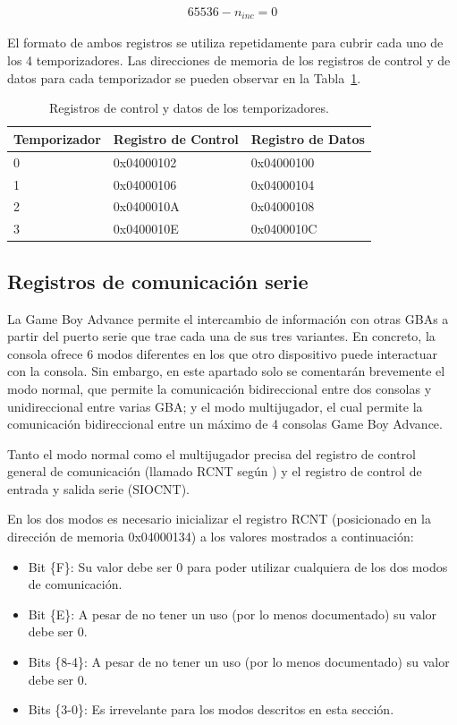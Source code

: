 \begin{align}
	65536 - n_{inc} = 0
	\label{eq:eq_temporizador}
\end{align}

El formato de ambos registros se utiliza repetidamente para cubrir cada uno de los 4 temporizadores. Las direcciones de memoria de los registros de control y de datos para cada temporizador se pueden observar en la Tabla~\ref{tab:temporizadores}.

\begin{table}[h]
	\centering
	\begin{tabular}{| l | l | l |}
		\hline
		\textbf{Temporizador} & \textbf{Registro de Control} & \textbf{Registro de Datos}  \\ \hline
		0 &  0x04000102 & 0x04000100  \\ \hline
		1 &  0x04000106 & 0x04000104  \\ \hline
		2 &  0x0400010A & 0x04000108  \\ \hline
		3 &  0x0400010E & 0x0400010C  \\ \hline
	\end{tabular}
	\caption{Registros de control y datos de los temporizadores.}\label{tab:temporizadores}
\end{table}
\FloatBarrier{}

\subsection{Registros de comunicación serie}
La Game Boy Advance permite el intercambio de información con otras GBAs a partir del puerto serie que trae cada una de sus tres variantes. En concreto, la consola ofrece 6 modos diferentes en los que otro dispositivo puede interactuar con la consola. Sin embargo, en este apartado solo se comentarán brevemente el modo normal, que permite la comunicación bidireccional entre dos consolas y unidireccional entre varias GBA; y el modo multijugador, el cual permite la comunicación bidireccional entre un máximo de 4 consolas Game Boy Advance.

Tanto el modo normal como el multijugador precisa del registro de control general de comunicación (llamado RCNT según \cite{bib:gbatek}) y el registro de control de entrada y salida serie (SIOCNT).

En los dos modos es necesario inicializar el registro RCNT (posicionado en la dirección de memoria 0x04000134) a los valores mostrados a continuación:

\begin{itemize}
	\item Bit \{F\}: Su valor debe ser 0 para poder utilizar cualquiera de los dos modos de comunicación.
	\item Bit \{E\}: A pesar de no tener un uso (por lo menos documentado) su valor debe ser 0.
	\item Bits \{8-4\}: A pesar de no tener un uso (por lo menos documentado) su valor debe ser 0.
	\item Bits \{3-0\}: Es irrevelante para los modos descritos en esta sección.
\end{itemize}

